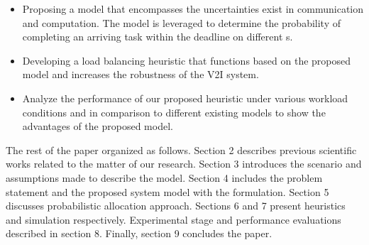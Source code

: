 \begin{itemize}
    \item Proposing a model that encompasses the uncertainties exist in communication and computation. The model is leveraged to determine the probability of completing an arriving task within the deadline on different \bs s.
    \item Developing a load balancing heuristic that functions based on the proposed model and increases the robustness of the V2I system.
    \item Analyze the performance of our proposed heuristic under various workload conditions and in comparison to different existing models to show the advantages of the proposed model.
\end{itemize}

The rest of the paper organized as follows. Section 2 describes previous scientific works related to the matter of our research. Section 3 introduces the scenario and assumptions made to describe the model. Section 4 includes the problem statement and the proposed system model with the formulation. Section 5 discusses probabilistic allocation approach. Sections 6 and 7 present heuristics and simulation respectively.  Experimental stage and performance evaluations described in section 8. Finally, section 9 concludes the paper.


